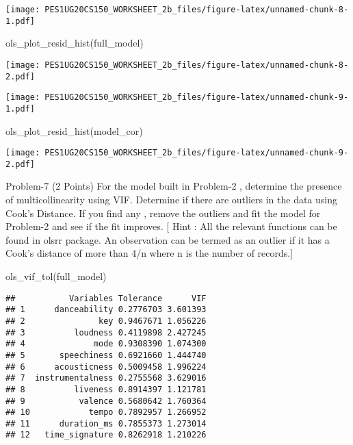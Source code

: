 \documentclass[
]{article}
\newenvironment{Shaded}{\begin{snugshade}}{\end{snugshade}}
\newcommand{\AttributeTok}[1]{\textcolor[rgb]{0.77,0.63,0.00}{#1}}
\newcommand{\DecValTok}[1]{\textcolor[rgb]{0.00,0.00,0.81}{#1}}
\newcommand{\FunctionTok}[1]{\textcolor[rgb]{0.00,0.00,0.00}{#1}}
\newcommand{\NormalTok}[1]{#1}
\newcommand{\SpecialCharTok}[1]{\textcolor[rgb]{0.00,0.00,0.00}{#1}}
\newcommand{\StringTok}[1]{\textcolor[rgb]{0.31,0.60,0.02}{#1}}
\begin{document}
\texttt{[image: PES1UG20CS150\_WORKSHEET\_2b\_files/figure-latex/unnamed-chunk-8-1.pdf]}

\begin{Shaded}
\begin{Highlighting}[]
\FunctionTok{ols\_plot\_resid\_hist}\NormalTok{(full\_model)}
\end{Highlighting}
\end{Shaded}

\texttt{[image: PES1UG20CS150\_WORKSHEET\_2b\_files/figure-latex/unnamed-chunk-8-2.pdf]}

\begin{Shaded}
\end{Shaded}

\texttt{[image: PES1UG20CS150\_WORKSHEET\_2b\_files/figure-latex/unnamed-chunk-9-1.pdf]}

\begin{Shaded}
\begin{Highlighting}[]
\FunctionTok{ols\_plot\_resid\_hist}\NormalTok{(model\_cor)}
\end{Highlighting}
\end{Shaded}

\texttt{[image: PES1UG20CS150\_WORKSHEET\_2b\_files/figure-latex/unnamed-chunk-9-2.pdf]}

Problem-7 (2 Points) For the model built in Problem-2 , determine the
presence of multicollinearity using VIF. Determine if there are outliers
in the data using Cook's Distance. If you find any , remove the outliers
and fit the model for Problem-2 and see if the fit improves. {[} Hint :
All the relevant functions can be found in olsrr package. An observation
can be termed as an outlier if it has a Cook's distance of more than 4/n
where n is the number of records.{]}

\begin{Shaded}
\begin{Highlighting}[]
\FunctionTok{ols\_vif\_tol}\NormalTok{(full\_model)}
\end{Highlighting}
\end{Shaded}

\begin{verbatim}
##           Variables Tolerance      VIF
## 1      danceability 0.2776703 3.601393
## 2               key 0.9467671 1.056226
## 3          loudness 0.4119898 2.427245
## 4              mode 0.9308390 1.074300
## 5       speechiness 0.6921660 1.444740
## 6      acousticness 0.5009458 1.996224
## 7  instrumentalness 0.2755568 3.629016
## 8          liveness 0.8914397 1.121781
## 9           valence 0.5680642 1.760364
## 10            tempo 0.7892957 1.266952
## 11      duration_ms 0.7855373 1.273014
## 12   time_signature 0.8262918 1.210226
\end{verbatim}
\end{document}
